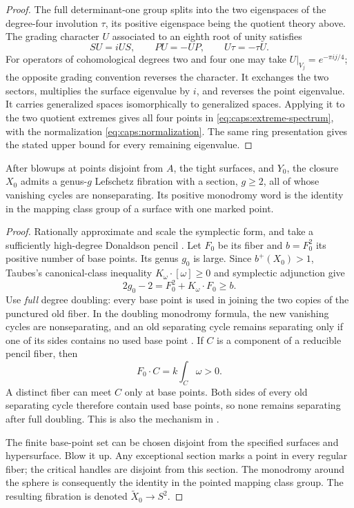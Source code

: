 \begin{proof}
The full determinant-one group splits into the two eigenspaces of the
degree-four involution $\tau$, its positive eigenspace being the
quotient theory above.  The grading character $U$ associated to an
eighth root of unity satisfies
\[
                  SU=iUS,\qquad PU=-UP,\qquad U\tau=-\tau U.
\]
For operators of cohomological degrees two and four one may take
$U|_{V_j}=e^{-\pi i j/4}$; the opposite grading convention reverses
the character.  It exchanges the two sectors, multiplies the surface
eigenvalue by $i$, and reverses the point eigenvalue.  It carries generalized
spaces isomorphically to generalized spaces.  Applying it to the two
quotient extremes gives all four points in
\eqref{eq:caps:extreme-spectrum}, with the normalization
\eqref{eq:caps:normalization}.  The same ring presentation gives the
stated upper bound for every remaining eigenvalue.
\end{proof}

\begin{lemma}\label{lem:caps:pencil}
After blowups at points disjoint from $A$, the tight surfaces, and $Y_0$,
the closure $X_0$ admits a genus-$g$ Lefschetz fibration with a section,
$g\ge2$, all of whose vanishing cycles are nonseparating.  Its positive
monodromy word is the identity in the mapping class group of a surface
with one marked point.
\end{lemma}

\begin{proof}
Rationally approximate and scale the symplectic form, and take a
sufficiently high-degree Donaldson pencil \cite{Donaldson1999}.
Let $F_0$ be its fiber and $b=F_0^2$ its positive number of base points.
Its genus $g_0$ is large.  Since $b^+(X_0)>1$, Taubes's canonical-class
inequality $K_\omega\cdot[\omega]\ge0$
\cite[Theorems~1--2]{Taubes1995} and symplectic adjunction give
\[
       2g_0-2=F_0^2+K_\omega\cdot F_0\ge b.
\]
Use \emph{full} degree doubling: every base point is used in joining the
two copies of the punctured old fiber.  In the doubling monodromy formula,
the new vanishing cycles are nonseparating, and an old separating cycle
remains separating only if one of its sides contains no used base point
\cite[Theorem~4]{AurouxKatzarkov2008}.  If $C$ is a component of a
reducible pencil fiber, then
\[
 F_0\cdot C=k\int_C\omega>0.
\]
A distinct fiber can meet $C$ only at base points.  Both sides of every
old separating cycle therefore contain used base points, so none remains
separating after full doubling.  This is also the mechanism in
\cite[Theorem~3.10]{Smith2001}.

The finite base-point set can be chosen disjoint from the specified
surfaces and hypersurface.  Blow it up.  Any exceptional section marks a
point in every regular fiber; the critical handles are disjoint from this
section.  The monodromy around the sphere is consequently the identity
in the pointed mapping class group.  The resulting fibration is denoted
$\widetilde X_0\to S^2$.
\end{proof}

